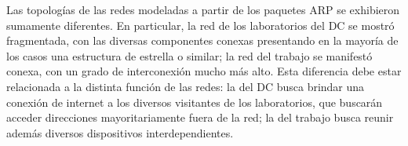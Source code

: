 \par Las topologías de las redes modeladas a partir de los paquetes ARP se exhibieron sumamente diferentes.
En particular, la red de los laboratorios del DC se mostró fragmentada, con las diversas componentes conexas presentando en la mayoría de los casos una estructura de estrella o similar; la red del trabajo se manifestó conexa, con un grado de interconexión mucho más alto.
Esta diferencia debe estar relacionada a la distinta función de las redes: la del DC busca brindar una conexión de internet a los diversos visitantes de los laboratorios, que buscarán acceder direcciones mayoritariamente fuera de la red; la del trabajo busca reunir además diversos dispositivos interdependientes.
